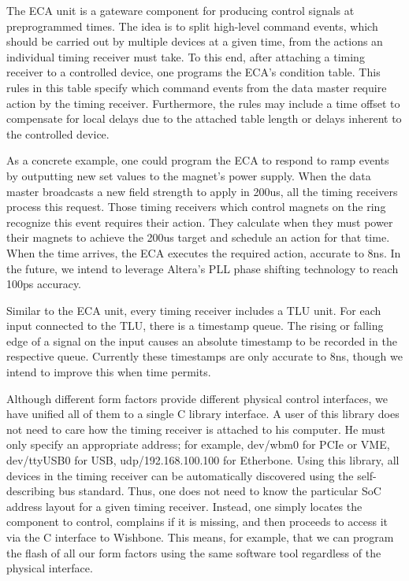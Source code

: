The ECA unit is a gateware component for producing control
signals at preprogrammed times.
The idea is to split high-level command events,
which should be carried out by multiple devices at a given time,
from the actions an individual timing receiver must take.
To this end, 
after attaching a timing receiver to a controlled device,
one programs the ECA's condition table.
This rules in this table 
specify which command events from the data master
require action by the timing receiver.
Furthermore, the rules may include a time offset to compensate 
for local delays due to the attached table length or delays
inherent to the controlled device.

As a concrete example, 
one could program the ECA to respond to ramp events
by outputting new set values to the magnet's power supply.
When the data master broadcasts a new field strength to apply in 200us,
all the timing receivers process this request.
Those timing receivers which control magnets on the ring
recognize this event requires their action.
They calculate when they must power their magnets to achieve
the 200us target and schedule an action for that time.
When the time arrives, the ECA executes the required action,
accurate to 8ns.
In the future,
we intend to leverage Altera's PLL phase shifting technology 
to reach 100ps accuracy.

Similar to the ECA unit,
every timing receiver includes a TLU unit.
For each input connected to the TLU, 
there is a timestamp queue.
The rising or falling edge of a signal on the input
causes an absolute timestamp to be recorded in the 
respective queue.
Currently these timestamps are only accurate to 8ns,
though we intend to improve this when time permits.

Although different form factors provide different physical control interfaces, 
we have unified all of them to a single C library interface.
A user of this library does not need to care how the timing 
receiver is attached to his computer.
He must only specify an appropriate address;
for example,
dev/wbm0 for PCIe or VME,
dev/ttyUSB0 for USB,
udp/192.168.100.100 for Etherbone.
Using this library, all devices in the timing receiver
can be automatically discovered using the self-describing bus standard.
Thus, one does not need to know the particular SoC address layout
for a given timing receiver.
Instead, one simply locates the component to control,
complains if it is missing,
and then proceeds to access it via the C interface to Wishbone.
This means, for example, 
that we can program the flash of all our form factors using the same 
software tool regardless of the physical interface.

